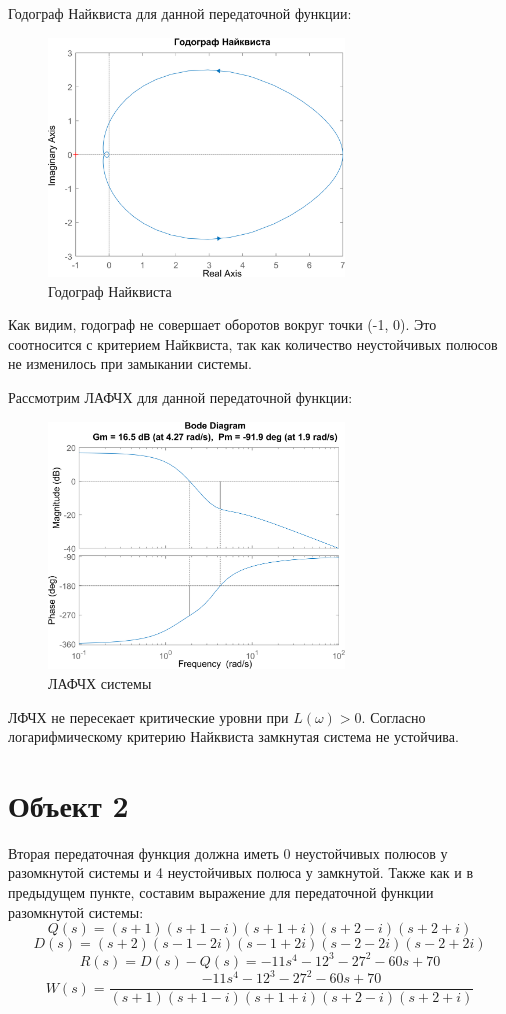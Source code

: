 Годограф Найквиста для данной передаточной функции:
\begin{figure}[H]
    \centering
    \includegraphics[width=0.7\textwidth, trim={0cm 0cm 0cm 0cm}]{../images/1_1_hod.png}
    \caption{Годограф Найквиста}
\end{figure}

Как видим, годограф не совершает оборотов вокруг точки (-1, 0). Это соотносится с критерием Найквиста, так как
количество неустойчивых полюсов не изменилось при замыкании системы.

Рассмотрим ЛАФЧХ для данной передаточной функции:
\begin{figure}[H]
    \centering
    \includegraphics[width=0.7\textwidth, trim={0cm 0cm 0cm 0cm}]{../images/1_1_lapfs.png}
    \caption{ЛАФЧХ системы}
\end{figure}

ЛФЧХ не пересекает критические уровни при $L(\omega)>0$. Согласно логарифмическому критерию Найквиста замкнутая система не устойчива.

\section{Объект 2}
Вторая передаточная функция должна иметь 0 неустойчивых полюсов у разомкнутой системы и 4 неустойчивых полюса у замкнутой.
Также как и в предыдущем пункте, составим выражение для передаточной функции разомкнутой системы:
\[
Q(s) = (s+1)(s+1-i)(s+1+i)(s+2-i)(s+2+i)
\]
\[
D(s) = (s+2)(s-1-2i)(s-1+2i)(s-2-2i)(s-2+2i)
\]
\[
R(s) = D(s) - Q(s) = -11s^4 - 12^3 - 27^2 -60s +70
\]
\[
W(s) = \frac{-11s^4 - 12^3 - 27^2 -60s +70}{(s+1)(s+1-i)(s+1+i)(s+2-i)(s+2+i)}
\]

